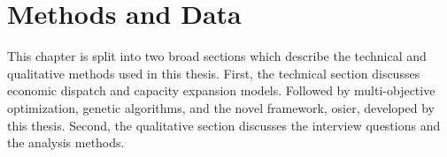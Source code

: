 \chapter{Methods and Data}

This chapter is split into two broad sections which describe the technical and
qualitative methods used in this thesis. First, the technical section discusses
economic dispatch and capacity expansion models. Followed by multi-objective
optimization, genetic algorithms, and the novel framework, \ac{osier}, developed
by this thesis. Second, the qualitative section discusses the interview
questions and the analysis methods.



